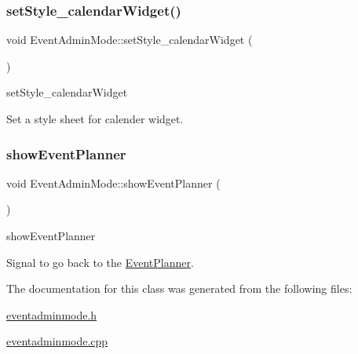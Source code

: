 \subsubsection{\texorpdfstring{set\+Style\+\_\+calendar\+Widget()}{setStyle\_calendarWidget()}}
{\footnotesize\ttfamily void Event\+Admin\+Mode\+::set\+Style\+\_\+calendar\+Widget (\begin{DoxyParamCaption}{ }\end{DoxyParamCaption})}



set\+Style\+\_\+calendar\+Widget 

Set a style sheet for calender widget. \mbox{\label{class_event_admin_mode_aff26ca6ac01a61846ccef0e55cc274de}} 
\subsubsection{\texorpdfstring{show\+Event\+Planner}{showEventPlanner}}
{\footnotesize\ttfamily void Event\+Admin\+Mode\+::show\+Event\+Planner (\begin{DoxyParamCaption}{ }\end{DoxyParamCaption})\hspace{0.3cm}{\ttfamily [signal]}}



show\+Event\+Planner 

Signal to go back to the \hyperlink{class_event_planner}{Event\+Planner}. 

The documentation for this class was generated from the following files\+:\begin{DoxyCompactItemize}
\item 
\hyperlink{eventadminmode_8h}{eventadminmode.\+h}\item 
\hyperlink{eventadminmode_8cpp}{eventadminmode.\+cpp}\end{DoxyCompactItemize}
